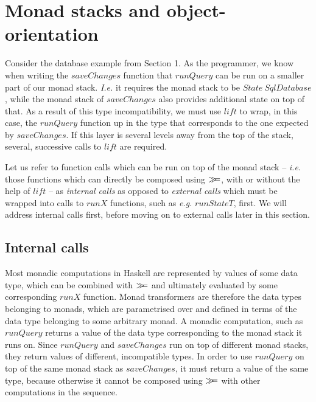 \section{Monad stacks and object-orientation}
\label{sec:objects}

Consider the database example from Section 1. As the programmer, we know when writing the $\mathit{saveChanges}$ function that $\mathit{runQuery}$ can be run on a smaller part of our monad stack. \emph{I.e.} it requires the monad stack to be $\mathit{State}~\mathit{SqlDatabase}$, while the monad stack of $\mathit{saveChanges}$ also provides additional state on top of that. As a result of this type incompatibility, we must use $\mathit{lift}$ to wrap, in this case, the $\mathit{runQuery}$ function up in the type that corresponds to the one expected by $\mathit{saveChanges}$. If this layer is several levels away from the top of the stack, several, successive calls to $\mathit{lift}$ are required.

Let us refer to function calls which can be run on top of the monad stack -- \emph{i.e.} those functions which can directly be composed using $\gg\!\!=$, with or without the help of $\mathit{lift}$ -- as \emph{internal calls} as opposed to \emph{external calls} which must be wrapped into calls to $\mathit{runX}$ functions, such as \emph{e.g.} $\mathit{runStateT}$, first. We will address internal calls first, before moving on to external calls later in this section. 

\subsection{Internal calls}

Most monadic computations in Haskell are represented by values of some data type, which can be combined with $\gg\!\!=$ and ultimately evaluated by some corresponding $\mathit{runX}$ function. Monad transformers are therefore the data types belonging to monads, which are parametrised over and defined in terms of the data type belonging to some arbitrary monad. A monadic computation, such as $\mathit{runQuery}$ returns a value of the data type corresponding to the monad stack it runs on. Since $\mathit{runQuery}$ and $\mathit{saveChanges}$ run on top of different monad stacks, they return values of different, incompatible types. In order to use $\mathit{runQuery}$ on top of the same monad stack as $\mathit{saveChanges}$, it must return a value of the same type, because otherwise it cannot be composed using $\gg\!\!=$ with other computations in the sequence. 

